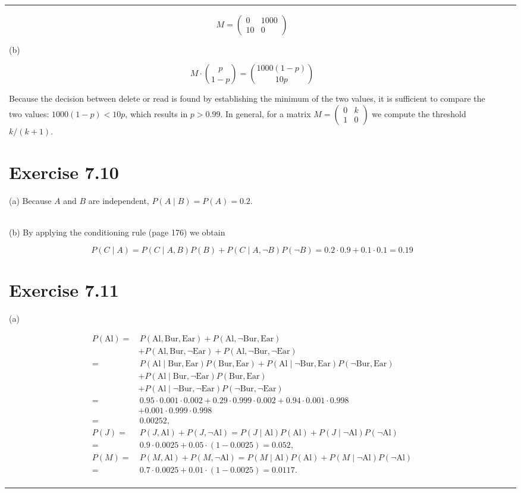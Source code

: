 \documentclass[10pt]{book}
\begin{document}
\begin{center}
\begin{tabular}{|l|l|l|}
$$
M=\begin{pmatrix}
0 & 1000 \\
10 & 0
\end{pmatrix}
$$

(b)

$$
M \cdot\binom{p}{1-p}=\binom{1000(1-p)}{10p}
$$

Because the decision between delete or read is found by establishing the minimum of the two values, it is sufficient to compare the two values: $1000(1-p)<10p$, which results in $p>0.99$. In general, for a matrix $M=\begin{pmatrix}0 & k \\ 1 & 0\end{pmatrix}$ we compute the threshold $k /(k+1)$.

\section{Exercise 7.10}
(a) Because $A$ and $B$ are independent, $P(A \mid B)=P(A)=0.2$.\\
(b) By applying the conditioning rule (page 176) we obtain

$$
P(C \mid A)=P(C \mid A, B) P(B)+P(C \mid A, \neg B) P(\neg B)=0.2 \cdot 0.9+0.1 \cdot 0.1=0.19
$$

\section{Exercise 7.11}
(a)

$$
\begin{aligned}
P(\text{Al})= & \, P(\text{Al}, \text{Bur}, \text{Ear})+P(\text{Al}, \neg \text{Bur}, \text{Ear}) \\
& +P(\text{Al}, \text{Bur}, \neg \text{Ear})+P(\text{Al}, \neg \text{Bur}, \neg \text{Ear}) \\
= & \, P(\text{Al} \mid \text{Bur}, \text{Ear}) P(\text{Bur}, \text{Ear})+P(\text{Al} \mid \neg \text{Bur}, \text{Ear}) P(\neg \text{Bur}, \text{Ear}) \\
& +P(\text{Al} \mid \text{Bur}, \neg \text{Ear}) P(\text{Bur}, \text{Ear}) \\
& +P(\text{Al} \mid \neg \text{Bur}, \neg \text{Ear}) P(\neg \text{Bur}, \neg \text{Ear}) \\
= & \, 0.95 \cdot 0.001 \cdot 0.002+0.29 \cdot 0.999 \cdot 0.002+0.94 \cdot 0.001 \cdot 0.998 \\
& +0.001 \cdot 0.999 \cdot 0.998 \\
= & \, 0.00252, \\
P(J)= & \, P(J, \text{Al})+P(J, \neg \text{Al})=P(J \mid \text{Al}) P(\text{Al})+P(J \mid \neg \text{Al}) P(\neg \text{Al}) \\
= & \, 0.9 \cdot 0.0025+0.05 \cdot(1-0.0025)=0.052, \\
P(M)= & \, P(M, \text{Al})+P(M, \neg \text{Al})=P(M \mid \text{Al}) P(\text{Al})+P(M \mid \neg \text{Al}) P(\neg \text{Al}) \\
= & \, 0.7 \cdot 0.0025+0.01 \cdot(1-0.0025)=0.0117.
\end{aligned}
$$


\end{tabular}
\end{center}
\end{document}
